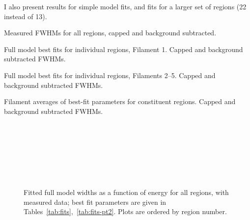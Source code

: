 \documentclass[iop, apj, numberedappendix, twocolappendix]{emulateapj}
\begin{document}
I also present results for simple model fits, and fits for a larger set of
regions (22 instead of 13).

\begin{table*}[ht]
    \tiny
    \centering
    \caption{Measured FWHMs for all regions, capped and background subtracted.}
    
\end{table*}

\begin{table}[ht]
    \tiny
    \centering
    \caption{Full model best fits for individual regions, Filament 1.  Capped
    and background subtracted FWHMs.}
    
\end{table}

\begin{table}[ht]
    \tiny
    \centering
    \caption{Full model best fits for individual regions, Filaments 2--5.
    Capped and background subtracted FWHMs.}
    
\end{table}

\begin{table*}[ht]
    \scriptsize
    \centering
    \caption{Filament averages of best-fit parameters for constituent regions.
    Capped and background subtracted FWHMs.}
    
\end{table*}

\begin{figure}[ht]
    \centering
     \\
     \\
     \\
     \\
     \\
     \\
    \caption{Fitted full model widths as a function of energy for all regions,
    with measured data; best fit parameters are given in
    Tables~\ref{tab:fits},~\ref{tab:fits-pt2}.  Plots are ordered by region
    number.}
\end{figure}
\end{document}
